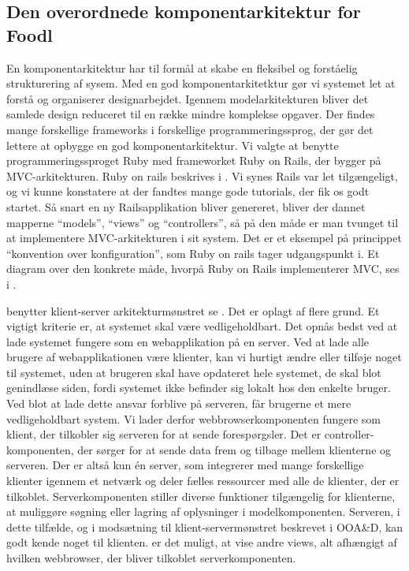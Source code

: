 \subsection{Den overordnede komponentarkitektur for Foodl}
\label{sec:overordnetkomponent}
En komponentarkitektur har til formål at skabe en fleksibel og forståelig strukturering af sysem. Med en god komponentarkitetktur gør vi systemet let at forstå og organiserer designarbejdet. Igennem modelarkitekturen bliver det samlede design reduceret til en række mindre komplekse opgaver\cite[s.~185]{ooad}. Der findes mange forskellige frameworks i forskellige programmeringssprog, der gør det lettere at opbygge en god komponentarkitektur. Vi valgte at benytte programmeringssproget Ruby med frameworket Ruby on Rails, der bygger på MVC-arkitekturen. Ruby on rails beskrives i . Vi synes Rails var let tilgængeligt, og vi kunne konstatere at der fandtes mange gode tutorials, der fik os godt startet. Så snart en ny Railsapplikation bliver genereret, bliver der dannet mapperne ``models'', ``views'' og ``controllers'', så på den måde er man tvunget til at implementere MVC-arkitekturen i sit system. Det er et eksempel på princippet ``konvention over konfiguration'', som Ruby on rails tager udgangspunkt i. Et diagram over den konkrete måde, hvorpå Ruby on Rails implementerer MVC, ses i .

\Foodl{} benytter klient-server arkitekturmønstret se . Det er oplagt af flere grund. Et vigtigt kriterie er, at systemet skal være vedligeholdbart. Det opnås bedst ved at lade systemet fungere som en webapplikation på en server. Ved at lade alle brugere af webapplikationen være klienter, kan vi hurtigt ændre eller tilføje noget til systemet, uden at brugeren skal have opdateret hele systemet, de skal blot genindlæse siden, fordi systemet ikke befinder sig lokalt hos den enkelte bruger. Ved blot at lade dette ansvar forblive på serveren, får brugerne et mere vedligeholdbart system. Vi lader derfor webbrowserkomponenten fungere som klient, der tilkobler sig serveren for at sende forespørgsler. Det er controller-komponenten, der sørger for at sende data frem og tilbage mellem klienterne og serveren. Der er altså kun én server, som integrerer med mange forskellige klienter igennem et netværk og deler fælles ressourcer med alle de klienter, der er tilkoblet. Serverkomponenten stiller diverse funktioner tilgængelig for klienterne, \fx at muliggøre søgning eller lagring af oplysninger i modelkomponenten. Serveren, i dette tilfælde, og i modsætning til klient-servermønstret beskrevet i OOA\&D\cite{ooad}, kan godt kende noget til klienten. \Fx er det muligt, at vise andre views, alt afhængigt af hvilken webbrowser, der bliver tilkoblet serverkomponenten.

